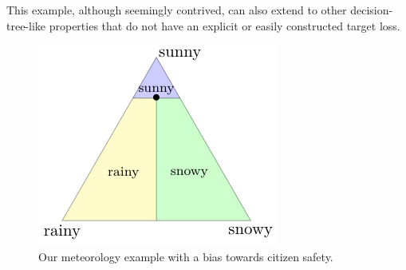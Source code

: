 \documentclass{article}
\begin{document}
This example, although seemingly contrived, can also extend to other decision-tree-like properties that do not have an explicit or easily constructed target loss.

\begin{figure}
	\centering
	\includegraphics[width=0.3\linewidth]{tikz/t-example.pdf}
	\caption{Our meteorology example with a bias towards citizen safety.}
	\label{fig:t-example}
\end{figure}
\end{document}
